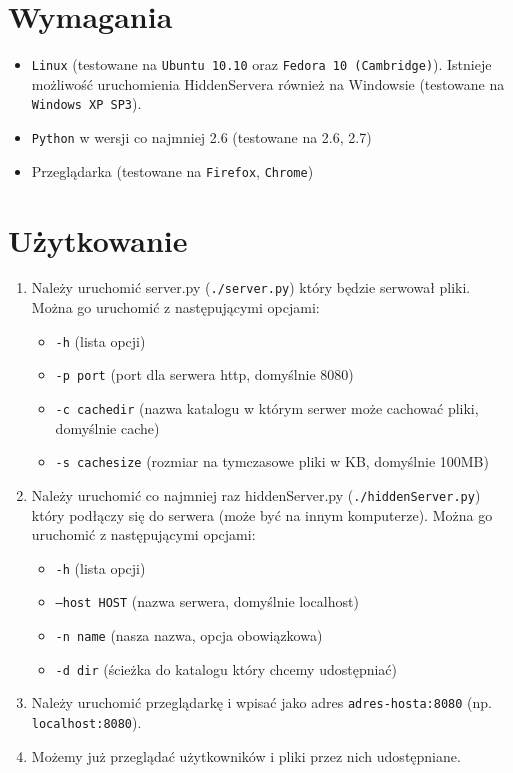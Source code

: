 \documentclass[a4paper,notitlepage]{article}
\begin{document}
\pagestyle{fancy}
\tableofcontents
\section{Wymagania}
\begin{itemize}
\item \texttt{Linux} (testowane na \texttt{Ubuntu 10.10} oraz 
	\texttt{Fedora 10 (Cambridge)}).
	Istnieje możliwość uruchomienia HiddenServera również na Windowsie 
	(testowane na \texttt{Windows XP SP3}).
\item \texttt{Python} w wersji co najmniej 2.6 (testowane na 2.6, 2.7)
\item Przeglądarka (testowane na \texttt{Firefox}, \texttt{Chrome})
\end{itemize}

\section{Użytkowanie}
\begin{enumerate}
\item Należy uruchomić server.py (\texttt{./server.py}) który będzie serwował pliki. Można go uruchomić z następującymi opcjami:
    \begin{itemize}
    \item \texttt{-h} (lista opcji)
    \item \texttt{-p port} (port dla serwera http, domyślnie 8080)
    \item \texttt{-c cachedir} (nazwa katalogu w którym serwer może cachować pliki, domyślnie cache)
    \item \texttt{-s cachesize} (rozmiar na tymczasowe pliki w KB, domyślnie 100MB)
    \end{itemize}
\item Należy uruchomić co najmniej raz hiddenServer.py (\texttt{./hiddenServer.py}) który podłączy się do serwera (może być na innym komputerze). Można go uruchomić z następującymi opcjami:
    \begin{itemize}
    \item \texttt{-h} (lista opcji)
    \item \texttt{--host HOST} (nazwa serwera, domyślnie localhost)
    \item \texttt{-n name} (nasza nazwa, opcja obowiązkowa)
    \item \texttt{-d dir} (ścieżka do katalogu który chcemy udostępniać)
    \end{itemize}
\item Należy uruchomić przeglądarkę i wpisać jako adres \texttt{adres-hosta:8080} (np. \texttt{localhost:8080}).
\item Możemy już przeglądać użytkowników i pliki przez nich udostępniane.
\end{enumerate}


   
\end{document}
